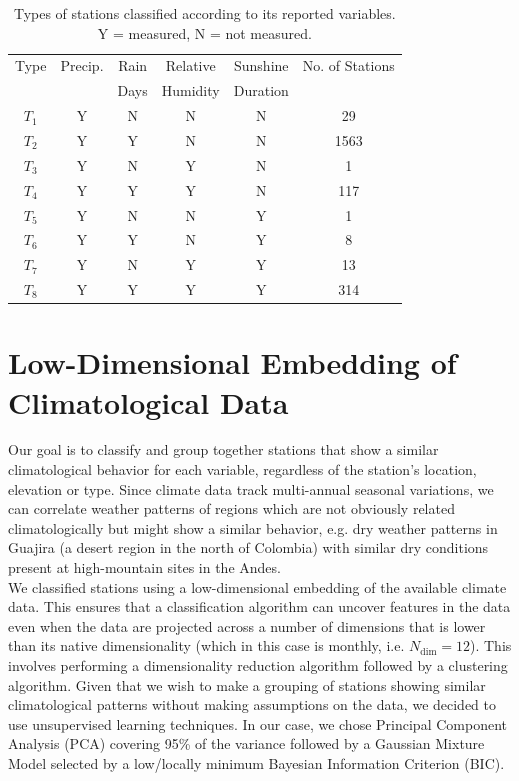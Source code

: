 \documentclass[a4paper,fleqn,usenatbib]{mnras}
\begin{document}
\begin{table}
\caption{\label{tabstype}Types of stations classified according to its reported variables. Y = measured, N = not measured.}
\begin{tabular}{@{}cccccc}
\midrule
Type&Precip.&Rain &Relative&Sunshine&No. of Stations\\
&&Days&Humidity&Duration&\\
\midrule
$T_1$&Y&N&N&N&29\\
$T_2$&Y&Y&N&N&1563\\
$T_3$&Y&N&Y&N&1\\
$T_4$&Y&Y&Y&N&117\\
$T_5$&Y&N&N&Y&1\\
$T_6$&Y&Y&N&Y&8\\
$T_7$&Y&N&Y&Y&13\\
$T_8$&Y&Y&Y&Y&314\\
\bottomrule
\end{tabular}
\end{table}

\section{Low-Dimensional Embedding of Climatological Data}

Our goal is to classify and group together stations that show a similar climatological behavior for each variable, regardless of the station's location, elevation or type. Since climate data track multi-annual seasonal variations, we can correlate weather patterns of regions which are not obviously related climatologically but might show a similar behavior, e.g. dry weather patterns in Guajira (a desert region in the north of Colombia) with similar dry conditions present at high-mountain sites in the Andes.\\

We classified stations using a low-dimensional embedding \citep{embed} of the available climate data. This ensures that a classification algorithm can uncover features in the data even when the data are projected across a number of dimensions that is lower than its native dimensionality (which in this case is monthly, i.e. $N_\mathrm{dim}=12$). This involves performing a dimensionality reduction algorithm followed by a clustering algorithm. Given that we wish to make a grouping of stations showing similar climatological patterns without making assumptions on the data, we decided to use unsupervised learning techniques.  In our case, we chose Principal Component Analysis (PCA) covering 95\% of the variance followed by a Gaussian Mixture Model selected by a low/locally minimum Bayesian Information Criterion (BIC). 
\end{document}
